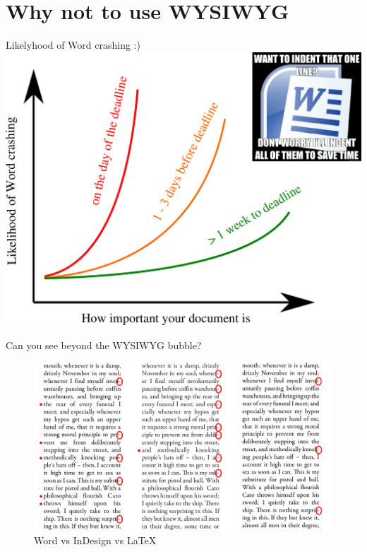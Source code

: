 \documentclass[10pt,times]{beamer}
\subtitle{\LaTeX, vector graphics, reference management and version control}
\begin{document}
\begin{frame}
  \titlepage
\end{frame}

\section{Why not to use WYSIWYG}

\begin{frame}{Likelyhood of Word crashing :) }
  \centering
  \includegraphics[height=0.8\textheight]{figs/word_crash}
\end{frame}

\begin{frame}{Can you see beyond the WYSIWYG bubble?}
  \begin{figure}
    \centering
    \includegraphics[width=\linewidth]{figs/LaTeX_InDesign_Word.png}
    \caption*{Word vs InDesign vs LaTeX}
\end{figure}
\end{frame}
\end{document}
